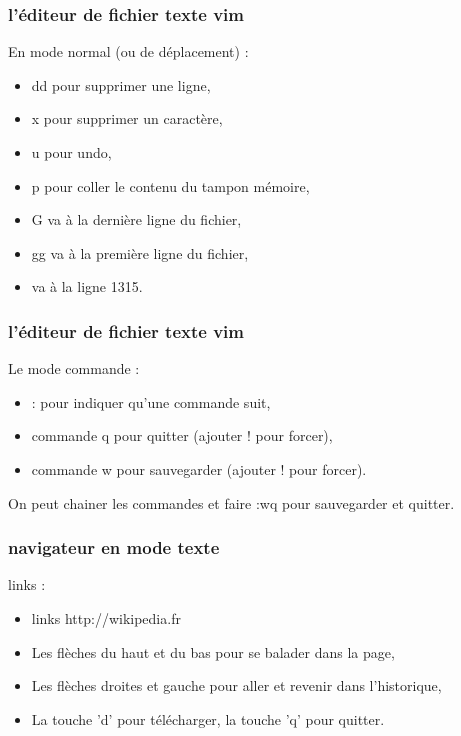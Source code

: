 \documentclass[handout,10pt]{beamer}
\begin{document}
\frame
{
    \frametitle{l'éditeur de fichier texte vim}

    En mode normal (ou de déplacement) :

    \begin{itemize}
        \item {\ttfamily dd} pour supprimer une ligne,
        \item {\ttfamily x} pour supprimer un caractère,
        \item {\ttfamily u} pour undo,
        \item {\ttfamily p} pour coller le contenu du tampon mémoire,
        \item {\ttfamily G} va à la dernière ligne du fichier,
        \item {\ttfamily gg} va à la première ligne du fichier,
        \item {} va à la ligne 1315.
    \end{itemize}
}


\frame
{
    \frametitle{l'éditeur de fichier texte vim}

    Le mode commande :
    
    \begin{itemize}
        \item {\ttfamily :} pour indiquer qu'une commande suit,
        \item commande {\ttfamily q} pour quitter (ajouter ! pour forcer),
        \item commande {\ttfamily w} pour sauvegarder (ajouter ! pour forcer).
    \end{itemize}

    On peut chainer les commandes et faire {\ttfamily :wq} pour sauvegarder et quitter.
}


\frame
{
    \frametitle{navigateur en mode texte}

    links :

    \begin{itemize}
        \item {\ttfamily links http://wikipedia.fr}
    \end{itemize}

    \begin{itemize}
        \item Les flèches du haut et du bas pour se balader dans la page,
        \item Les flèches droites et gauche pour aller et revenir dans l'historique,
        \item La touche 'd' pour télécharger, la touche 'q' pour quitter.
    \end{itemize}
}
\end{document}
